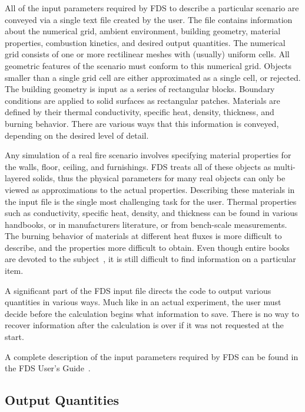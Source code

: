 \documentclass[11pt]{book}
\begin{document}
All of the input parameters required by FDS to describe a particular
scenario are conveyed via a single text file created by the user.
The file contains information about the numerical grid, ambient environment, building geometry, material
properties, combustion kinetics, and desired output quantities.
The numerical grid consists of one or more rectilinear meshes with (usually) uniform cells. All geometric features of the
scenario must conform to this numerical grid. Objects smaller than a single grid cell are either approximated
as a single cell, or rejected. The building geometry is input as a series of rectangular blocks. Boundary conditions are
applied to solid surfaces as rectangular patches. Materials are defined by their thermal conductivity, specific heat,
density, thickness, and burning behavior. There are various ways that this information is conveyed, depending on the
desired level of detail.

Any simulation of a real fire scenario involves specifying material properties for the walls, floor, ceiling,
and furnishings. FDS treats all of these objects as multi-layered solids, thus the physical parameters for many real
objects can only be viewed as approximations to the actual properties. Describing these materials in the input file is
the single most challenging task for the user. Thermal properties such as conductivity, specific heat,
density, and thickness can be found in various handbooks, or in manufacturers literature, or from bench-scale measurements.
The burning behavior of materials at different heat fluxes is more difficult to describe, and the properties more difficult
to obtain. Even though entire books are devoted to the
subject~\cite{Babrauskas:2}, it is still difficult to find information on a particular item.

A significant part of the FDS input file directs the code to output various quantities in various ways. Much like in an
actual experiment, the user must decide before the calculation begins what information to save. There is no way to
recover information after the calculation is over if it was not requested at the start.

A complete description of the input parameters required by FDS can be found in the FDS User's Guide~\cite{FDS_Users_Guide_5}.


\subsection{Output Quantities}
\end{document}
